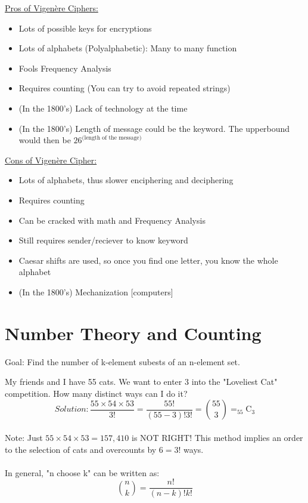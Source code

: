 \underline{Pros of Vigen\`ere Ciphers:}
\begin{itemize}
\item Lots of possible keys for encryptions
\item Lots of alphabets (Polyalphabetic): Many to many function
\item Fools Frequency Analysis
\item Requires counting (You can try to avoid repeated strings)
\item (In the 1800's) Lack of technology at the time
\item (In the 1800's) Length of message could be the keyword.  The upperbound would then be $26^\text{(length of the message)}$
\end{itemize}

\underline{Cons of Vigen\`ere Cipher:}
\begin{itemize}
\item Lots of alphabets, thus slower enciphering and deciphering
\item Requires counting
\item Can be cracked with math and Frequency Analysis
\item Still requires sender/reciever to know keyword
\item Caesar shifts are used, so once you find one letter, you know the whole alphabet
\item (In the 1800's) Mechanization [computers]
\end{itemize}

\section{Number Theory and Counting}

Goal: Find the number of k-element subests of an n-element set.

\begin{example} My friends and I have 55 cats. We want to enter 3 into the "Loveliest Cat" competition. How many distinct ways can I do it? \\

$$Solution: \frac{55 \times 54 \times 53}{3!} = \frac{55!}{(55-3)!3!} = \binom{55}{3} = _{55}\mathrm{C}_{3}$$\\

Note: Just $55 \times 54 \times 53 = 157,410$ is NOT RIGHT! This method implies an order to the selection of cats and overcounts by $6 = 3!$ ways.\\ \\
In general, "n choose k" can be written as: $$ \binom{n}{k} = \frac{n!}{(n-k)!k!}$$
\end{example}

